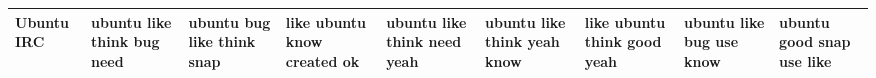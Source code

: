\documentclass[11pt,a4paper]{article}
\begin{document}
\begin{appendices}
\begin{table}[htp]
\begin{tiny}
\begin{tabular}{|p{}|p{}|p{}|p{}|p{}|p{}|p{}|p{}|p{}|}
Ubuntu IRC & ubuntu \newline like \newline think \newline bug \newline need & ubuntu \newline bug \newline like \newline think \newline snap & like \newline ubuntu \newline know \newline created \newline ok & ubuntu \newline like \newline think \newline need \newline yeah & ubuntu \newline like \newline think \newline yeah \newline know & like \newline ubuntu \newline think \newline good \newline yeah & ubuntu \newline like \newline bug \newline use \newline know & ubuntu \newline good \newline snap \newline use \newline like\\\hline

\end{tabular}
\end{tiny}
\end{table}
\end{appendices}
\end{document}
